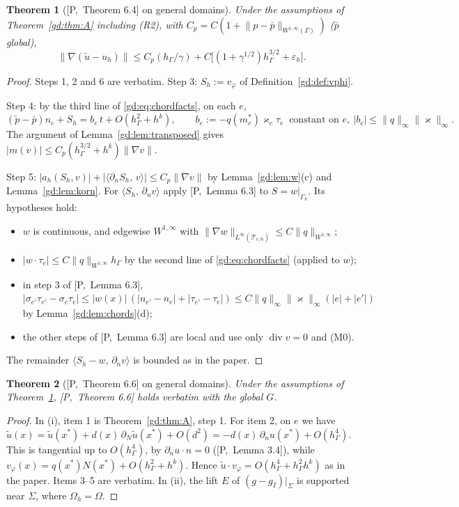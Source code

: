 \documentclass[11pt,reqno]{amsart}
\theoremstyle{plain}
\newtheorem{theorem}{Theorem}[section]
\theoremstyle{definition}
\newcommand{\hG}{h_\Gamma}
\newcommand{\Gh}{\Gamma_h}
\newcommand{\Oh}{\Omega_h}
\newcommand{\gI}{g_I}
\newcommand{\dn}{\partial_n}
\newcommand{\ut}{\tilde u}
\newcommand{\pt}{\tilde p}
\newcommand{\pbar}{\bar p}
\newcommand{\ip}[2]{\langle #1,\, #2\rangle}
\newcommand{\norm}[1]{\lVert #1\rVert}
\newcommand{\eps}{\varepsilon_h}
\renewcommand{\div}{\operatorname{div}}
\newcommand{\kap}{\varkappa}            %
\newcommand{\kapi}{\norm{\kap}_\infty}
\newcommand{\Pref}[1]{\textup{[P,~#1]}}
\begin{document}
\begin{theorem}[\Pref{Theorem 6.4} on general domains]\label{gd:thm:C}
Under the assumptions of Theorem~\ref{gd:thm:A} including (R2), with $C_p=C(1+\norm{p-\pbar}_{W^{1,\infty}(\Gamma)})$ ($\pbar$ global),
\[
\norm{\nabla(\ut-u_h)}\le C_p(\hG/\gamma)+C\bigl[(1+\gamma^{1/2})\hG^{3/2}+\eps\bigr].
\]
\end{theorem}

\begin{proof}
Steps 1, 2 and 6 are verbatim. Step 3: $S_h:=v_\varphi$ of Definition~\ref{gd:def:vphi}.

Step 4: by the third line of \eqref{gd:eq:chordfacts}, on each $e$,
\[
(\pt-\pbar)n_e+S_h=b_e\,t+O(\hG^2+h^k),\qquad b_e:=-q(m_e^\ast)\kap_e\tau_e\ \text{ constant on }e,\ |b_e|\le\norm q_\infty\kapi .
\]
The argument of Lemma~\ref{gd:lem:transposed} gives $|m(v)|\le C_p(\hG^{3/2}+h^k)\norm{\nabla v}$.

Step 5: $|a_h(S_h,v)|+|\ip{\dn S_h}{v}|\le C_p\norm{\nabla v}$ by Lemma~\ref{gd:lem:w}(c) and Lemma~\ref{gd:lem:korn}. For $\ip{S_h}{\dn v}$ apply \Pref{Lemma 6.3} to $S=w|_{\Gh}$. Its hypotheses hold:
\begin{itemize}
\item $w$ is continuous, and edgewise $W^{1,\infty}$ with $\norm{\nabla w}_{L^\infty(\mathcal T_{r/8})}\le C\norm q_{W^{1,\infty}}$;
\item $|w\cdot\tau_e|\le C\norm q_{W^{1,\infty}}\hG$ by the second line of \eqref{gd:eq:chordfacts} (applied to $w$);
\item in step 3 of \Pref{Lemma 6.3}, $|\sigma_{e'}\tau_{e'}-\sigma_e\tau_e|\le|w(x)|\,(|n_{e'}-n_e|+|\tau_{e'}-\tau_e|)\le C\norm q_\infty\kapi(|e|+|e'|)$ by Lemma~\ref{gd:lem:chords}(d);
\item the other steps of \Pref{Lemma 6.3} are local and use only $\div v=0$ and (M0).
\end{itemize}
The remainder $\ip{S_h-w}{\dn v}$ is bounded as in the paper.
\end{proof}

\begin{theorem}[\Pref{Theorem 6.6} on general domains]\label{gd:thm:B}
Under the assumptions of Theorem~\ref{gd:thm:C}, \Pref{Theorem 6.6} holds verbatim with the global $G$.
\end{theorem}

\begin{proof}
In (i), item 1 is Theorem~\ref{gd:thm:A}, step 1. For item 2, on $e$ we have $\ut(x)=\ut(x^\ast)+d(x)\,\partial_N\ut(x^\ast)+O(d^2)=-d(x)\,\dn u(x^\ast)+O(\hG^4)$. This is tangential up to $O(\hG^4)$, by $\dn u\cdot n=0$ (\Pref{Lemma 3.4}), while $v_\varphi(x)=q(x^\ast)N(x^\ast)+O(\hG^2+h^k)$. Hence $\ut\cdot v_\varphi=O(\hG^4+\hG^2h^k)$ as in the paper. Items 3--5 are verbatim. In (ii), the lift $E$ of $(g-\gI)|_\Sigma$ is supported near $\Sigma$, where $\Oh=\Omega$.
\end{proof}
\end{document}

